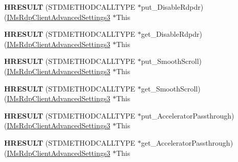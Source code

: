 \begin{DoxyCompactItemize}
{\bfseries H\+R\+E\+S\+U\+LT} (S\+T\+D\+M\+E\+T\+H\+O\+D\+C\+A\+L\+L\+T\+Y\+PE $\ast$put\+\_\+\+Disable\+Rdpdr)(\hyperlink{interface_m_s_t_s_c_lib_1_1_i_ms_rdp_client_advanced_settings3}{I\+Ms\+Rdp\+Client\+Advanced\+Settings3} $\ast$This
\item 
\mbox{\label{struct_m_s_t_s_c_lib_1_1_i_ms_rdp_client_advanced_settings3_vtbl_a15edcc42dcaf059867f92fc1ba953292}} 
{\bfseries H\+R\+E\+S\+U\+LT} (S\+T\+D\+M\+E\+T\+H\+O\+D\+C\+A\+L\+L\+T\+Y\+PE $\ast$get\+\_\+\+Disable\+Rdpdr)(\hyperlink{interface_m_s_t_s_c_lib_1_1_i_ms_rdp_client_advanced_settings3}{I\+Ms\+Rdp\+Client\+Advanced\+Settings3} $\ast$This
\item 
\mbox{\label{struct_m_s_t_s_c_lib_1_1_i_ms_rdp_client_advanced_settings3_vtbl_aff42c5edef690259ec05d216959ee45a}} 
{\bfseries H\+R\+E\+S\+U\+LT} (S\+T\+D\+M\+E\+T\+H\+O\+D\+C\+A\+L\+L\+T\+Y\+PE $\ast$put\+\_\+\+Smooth\+Scroll)(\hyperlink{interface_m_s_t_s_c_lib_1_1_i_ms_rdp_client_advanced_settings3}{I\+Ms\+Rdp\+Client\+Advanced\+Settings3} $\ast$This
\item 
\mbox{\label{struct_m_s_t_s_c_lib_1_1_i_ms_rdp_client_advanced_settings3_vtbl_ae05648279d8aa69986cd7605c8d7a042}} 
{\bfseries H\+R\+E\+S\+U\+LT} (S\+T\+D\+M\+E\+T\+H\+O\+D\+C\+A\+L\+L\+T\+Y\+PE $\ast$get\+\_\+\+Smooth\+Scroll)(\hyperlink{interface_m_s_t_s_c_lib_1_1_i_ms_rdp_client_advanced_settings3}{I\+Ms\+Rdp\+Client\+Advanced\+Settings3} $\ast$This
\item 
\mbox{\label{struct_m_s_t_s_c_lib_1_1_i_ms_rdp_client_advanced_settings3_vtbl_a6b58f85a6e695b6282f483b740eecf19}} 
{\bfseries H\+R\+E\+S\+U\+LT} (S\+T\+D\+M\+E\+T\+H\+O\+D\+C\+A\+L\+L\+T\+Y\+PE $\ast$put\+\_\+\+Accelerator\+Passthrough)(\hyperlink{interface_m_s_t_s_c_lib_1_1_i_ms_rdp_client_advanced_settings3}{I\+Ms\+Rdp\+Client\+Advanced\+Settings3} $\ast$This
\item 
\mbox{\label{struct_m_s_t_s_c_lib_1_1_i_ms_rdp_client_advanced_settings3_vtbl_a8e682472b6a740e3d80fa0e6af18a0e0}} 
{\bfseries H\+R\+E\+S\+U\+LT} (S\+T\+D\+M\+E\+T\+H\+O\+D\+C\+A\+L\+L\+T\+Y\+PE $\ast$get\+\_\+\+Accelerator\+Passthrough)(\hyperlink{interface_m_s_t_s_c_lib_1_1_i_ms_rdp_client_advanced_settings3}{I\+Ms\+Rdp\+Client\+Advanced\+Settings3} $\ast$This

\end{DoxyCompactItemize}
